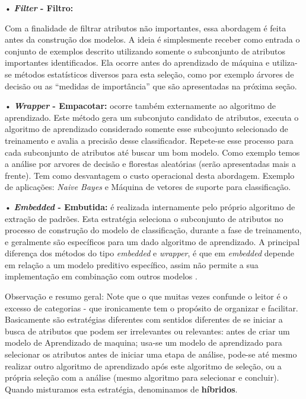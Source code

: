 \documentclass[
  openany]{book}
\begin{document}
• \textbf{\emph{Filter} - Filtro:}

Com a finalidade de filtrar atributos não importantes, essa abordagem é feita antes da construção dos modelos. A ideia é simplesmente receber como entrada o
conjunto de exemplos descrito utilizando somente o subconjunto de atributos importantes identificados. Ela ocorre antes do aprendizado de máquina \citep{john1994irrelevant} e utiliza-se métodos estatísticos diversos para esta seleção, como por exemplo árvores de decisão ou as ``medidas de importância'' que são apresentadas na próxima seção.

• \textbf{\emph{Wrapper} - Empacotar:} ocorre também externamente ao algoritmo de aprendizado. Este método gera um subconjuto candidato de atributos, executa o algoritmo de aprendizado considerado somente esse subcojunto selecionado de treinamento e avalia a precisão desse classificador. Repete-se esse processo para cada subconjunto de atributos até buscar um bom modelo. Como exemplo temos a análise por arvores de decisão e florestas aleatórias (serão apresentadas mais a frente). Tem como desvantagem o custo operacional desta abordagem. Exemplo de aplicações: \emph{Naive Bayes} e Máquina de vetores de suporte para classificação.

• \textbf{\emph{Embedded} - Embutida:} é realizada internamente pelo próprio algoritmo de extração de padrões. Esta estratégia seleciona o subconjunto de atributos no processo de construção do modelo de classificação, durante a fase de treinamento, e geralmente são específicos para um dado algoritmo de aprendizado. A principal diferença dos métodos do tipo \emph{embedded} e \emph{wrapper},
é que em \emph{embedded} depende em relação a um modelo preditivo específico, assim não permite a sua implementação em combinação com outros modelos \citep{souza2014computational}.

Observação e resumo geral: Note que o que muitas vezes confunde o leitor é o excesso de categorias - que ironicamente tem o propósito de organizar e facilitar. Basicamente são estratégias diferentes com sentidos diferentes de se iniciar a busca de atributos que podem ser irrelevantes ou relevantes: antes de criar um modelo de Aprendizado de maquina; usa-se um modelo de aprendizado para selecionar os atributos antes de iniciar uma etapa de análise, pode-se até mesmo realizar outro algoritmo de aprendizado após este algoritmo de seleção, ou a própria seleção com a análise (mesmo algoritmo para selecionar e concluir). Quando misturamos esta estratégia, denominamos de \textbf{híbridos}.
\end{document}
